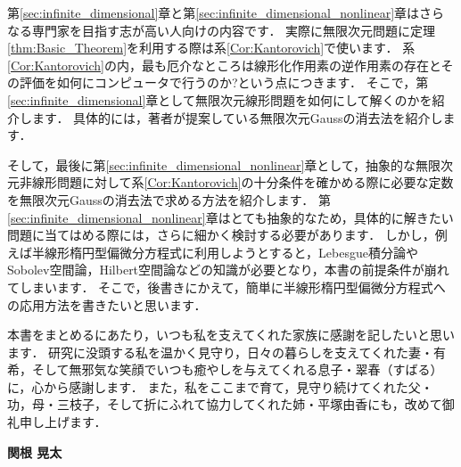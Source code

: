 \documentclass[paper=a5,fontsize=10pt,book]{jlreq}
\begin{document}
第\ref{sec:infinite_dimensional}章と第\ref{sec:infinite_dimensional_nonlinear}章はさらなる専門家を目指す志が高い人向けの内容です．
実際に無限次元問題に定理\ref{thm:Basic_Theorem}を利用する際は系\ref{Cor:Kantorovich}で使います．
系\ref{Cor:Kantorovich}の内，最も厄介なところは線形化作用素の逆作用素の存在とその評価を如何にコンピュータで行うのか?という点につきます．
そこで，第\ref{sec:infinite_dimensional}章として無限次元線形問題を如何にして解くのかを紹介します．
具体的には，著者が提案している無限次元Gaussの消去法を紹介します．

そして，最後に第\ref{sec:infinite_dimensional_nonlinear}章として，抽象的な無限次元非線形問題に対して系\ref{Cor:Kantorovich}の十分条件を確かめる際に必要な定数を無限次元Gaussの消去法で求める方法を紹介します．
第\ref{sec:infinite_dimensional_nonlinear}章はとても抽象的なため，具体的に解きたい問題に当てはめる際には，さらに細かく検討する必要があります．
しかし，例えば半線形楕円型偏微分方程式に利用しようとすると，Lebesgue積分論やSobolev空間論，Hilbert空間論などの知識が必要となり，本書の前提条件が崩れてしまいます．
そこで，後書きにかえて，簡単に半線形楕円型偏微分方程式への応用方法を書きたいと思います．

本書をまとめるにあたり，いつも私を支えてくれた家族に感謝を記したいと思います．
研究に没頭する私を温かく見守り，日々の暮らしを支えてくれた妻・有希，そして無邪気な笑顔でいつも癒やしを与えてくれる息子・翠春（すばる）に，心から感謝します．
また，私をここまで育て，見守り続けてくれた父・功，母・三枝子，そして折にふれて協力してくれた姉・平塚由香にも，改めて御礼申し上げます．

\vspace{1cm}

\begin{flushright}
\textbf{関根 晃太}
\end{flushright}


\newpage

\tableofcontents

\newpage











\printindex
\end{document}
